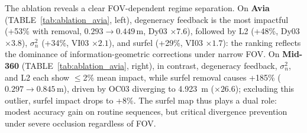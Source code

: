\documentclass[conference]{IEEEtran}
\begin{document}
\begin{table}[t]
  \centering
  \caption{Ablation: ATE RMSE [\si{\meter}] on M3DGR Avia (70\textdegree{}) and
  Mid-360 (360\textdegree{}). Underline = full system. The three
  per-sequence columns are deliberately chosen \emph{regime extremes}
  (dynamic / corridor degeneracy) and their arithmetic mean does not
  equal $\overline{\mathrm{ATE}}_9$, which is the average over all
  nine sequences. Each ablation row disables one mechanism from the
  sensor-specific configuration used in
  TABLE~\ref{tab:m3dgr_outdoor}.}
  \label{tab:ablation_avia}
  \small
\end{table}

The ablation reveals a clear FOV-dependent regime separation. On
\textbf{Avia} (TABLE~\ref{tab:ablation_avia}, left), degeneracy
feedback is the most impactful (+53\% with removal, $0.293{\to}0.449$\,m,
Dy03 $\times 7.6$), followed by L2 (+48\%, Dy03 $\times 3.8$),
$\sigma^2_n$ (+34\%, VI03 $\times 2.1$), and surfel (+29\%, VI03
$\times 1.7$): the ranking reflects the dominance of
information-geometric corrections under narrow FOV. On
\textbf{Mid-360} (TABLE~\ref{tab:ablation_avia}, right), in contrast,
degeneracy feedback, $\sigma^2_n$, and L2 each show $\le$2\% mean
impact, while surfel removal causes +185\% ($0.297{\to}0.845$\,m),
driven by OC03 diverging to \SI{4.923}{\meter} ($\times 26.6$);
excluding this outlier, surfel impact drops to +8\%. The surfel map
thus plays a dual role: modest accuracy gain on routine sequences,
but critical divergence prevention under severe occlusion regardless
of FOV.
\end{document}
